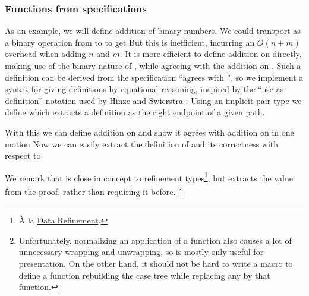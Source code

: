\subsubsection{Functions from specifications}\label{ssec:useas}
As an example, we will define addition of binary numbers. We could transport \AgdaFunction{\_+\_} as a binary operation
from \bN to \bL to get
But this is inefficient, incurring an $O(n + m)$ overhead when adding $n$ and $m$. It is more efficient to define addition on \bL{} directly, making use of the binary nature of \bL{}, while agreeing with the addition on \bN{}. Such a definition can be derived from the specification ``agrees with \AgdaFunction{\_+\_}'', so we implement a syntax for giving definitions by equational reasoning, inspired by the ``use-as-definition'' notation used by Hinze and Swierstra \cite{calcdata}: Using an implicit pair type
we define
which extracts a definition as the right endpoint of a given path.

With this we can define addition on \bL{} and show it agrees with addition on \bN{} in one motion
Now we can easily extract the definition of  and its correctness with respect to \AgdaFunction{\_+\_} 

We remark that  is close in concept to refinement types\footnote{À la \href{https://agda.github.io/agda-stdlib/Data.Refinement.html}{Data.Refinement}.}, but extracts the value from the proof, rather than requiring it before. \footnote{Unfortunately, normalizing an application of a  function also causes a lot of unnecessary wrapping and unwrapping, so  is mostly only useful for presentation. On the other hand, it should not be hard to write a macro to define a function rebuilding the case tree while replacing any  by that function.}


